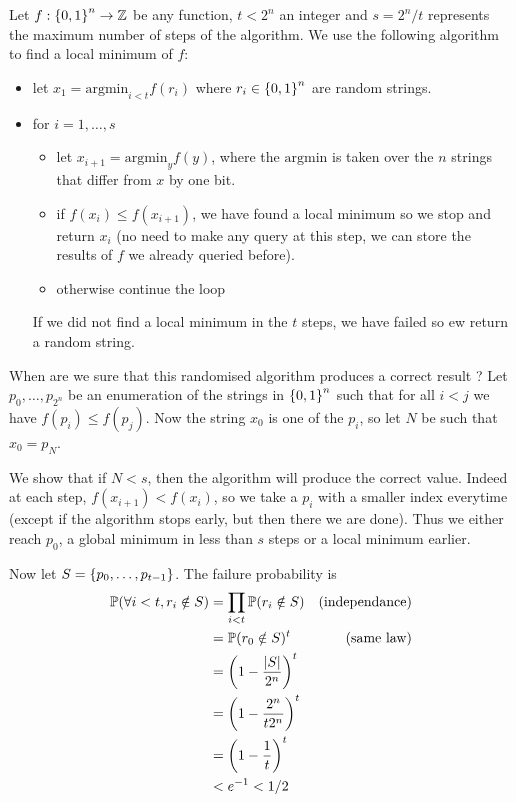     Let $f : \left\{ 0, 1 \right\}^n \to \mathbb Z$ be any function, $t < 2^n$ an integer
    and $s = 2^{n} / t$ represents the maximum number of steps of the algorithm.
    We use the following algorithm to find a local minimum of $f$:
    \begin{itemize}
        \item let $x_1 = \mathrm{argmin}_{i < t} f(r_i)$
            where $r_i \in \left\{ 0, 1 \right\}^n$ are random strings.
        \item for $i = 1, \dots, s$
        \begin{itemize}
            \item let $x_{i+1} = \mathrm{argmin}_{y} f(y)$, where the $\mathrm{argmin}$
                is taken over the $n$ strings that differ from $x$ by one bit.
            \item if $f(x_i) \leq f(x_{i+1})$, we have found a local minimum 
                so we stop and return $x_i$ (no need to make any query at this step, 
                we can store the results of $f$ we already queried before).
            \item otherwise continue the loop
        \end{itemize}
        If we did not find a local minimum in the $t$ steps, we have failed
        so ew return a random string.
    \end{itemize}

    When are we sure that this randomised algorithm produces a correct result ?
    Let $p_0, \dots, p_{2^n}$ be an enumeration of the strings in $\left\{ 0, 1 \right\}^n$
    such that for all $i <j$ we have $f(p_i) \leq f(p_j)$.
    Now the string $x_0$ is one of the $p_i$, so let $N$ be such that $x_0 = p_N$.
    
    We show that if $N < s$, then the algorithm will produce the correct value.
    Indeed at each step, $f(x_{i+1}) < f(x_i)$, so we take a $p_i$
    with a smaller index everytime
    (except if the algorithm stops early, but then there we are done).
    Thus we either reach $p_0$, a global minimum in less than $s$ steps
    or a local minimum earlier.

    Now let $S = \left\{ p_0, \dots, p_{t-1} \right\}$.
    The failure probability is 
    \begin{align*}
        \mathbb P(\forall i < t, r_i \notin S) 
        &= \prod_{i < t} \mathbb P(r_i \notin S) & (\text{independance})
        \\&= \mathbb P(r_0 \notin S)^t              & (\text{same law})
        \\&= \left(1 - \frac{\left| S \right|}{2^n}\right)^t
        \\&= \left(1 - \frac{2^{n}}{t2^n}\right)^t
        \\&= \left(1 - \frac{1}{t}\right)^t
        \\&< e^{-1} < 1/2
    \end{align*}

